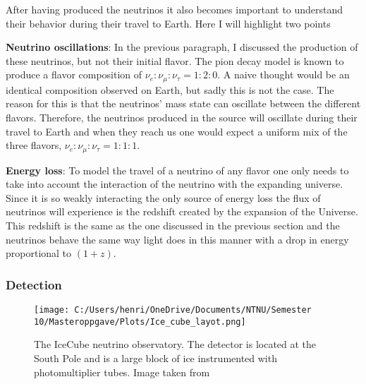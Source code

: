 After having produced the neutrinos it also becomes important to understand their behavior during their travel to Earth. Here I will highlight two points


\textbf{Neutrino oscillations}:
In the previous paragraph, I discussed the production of these neutrinos, but not their initial flavor.
The pion decay model is known to produce a flavor composition of $\nu_e : \nu_\mu : \nu_\tau = 1:2:0$. 
A naive thought would be an identical composition observed on Earth, but sadly this is not the case. 
The reason for this is that the neutrinos' mass state can oscillate between the different flavors. Therefore, the neutrinos produced in the source will oscillate during their travel to Earth and when they reach us one would expect a 
uniform mix of the three flavors, $ \nu_e: \nu_\mu: \nu_\tau = 1:1:1$.

\textbf{Energy loss}:
To model the travel of a neutrino of any flavor one only needs to take into account the interaction of the neutrino with the expanding universe. Since it is so weakly interacting the only 
source of energy loss the flux of neutrinos will experience is the redshift created by the expansion of the Universe. This redshift is the same as the one discussed in the previous section and the neutrinos 
behave the same way light does in this manner with a drop in energy proportional to $(1+z)$.



 

\subsubsection{Detection}
\begin{figure}
    \centering
    \texttt{[image: C:/Users/henri/OneDrive/Documents/NTNU/Semester 10/Masteroppgave/Plots/Ice\_cube\_layot.png]}
    \caption{The IceCube neutrino observatory. The detector is located at the South Pole and is a large block of ice instrumented with photomultiplier tubes. Image taken from \cite{Andeen_2019}}
    \label{fig:Ice_cube}
\end{figure}


